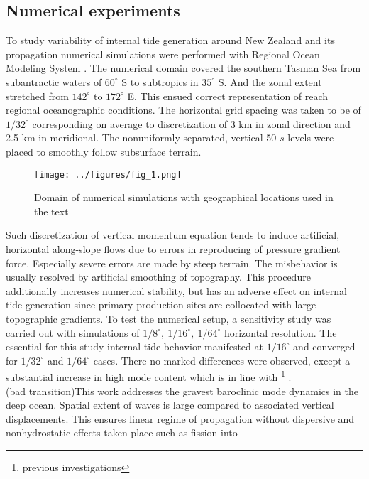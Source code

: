 \documentclass[12pt]{article}
\begin{document}
\subsection{Numerical experiments}
To study variability of internal tide generation around New Zealand and its propagation numerical 
simulations were performed with Regional Ocean Modeling System \citep{shchepetkin2005regional}. 
The numerical domain covered the southern Tasman Sea from subantractic waters of $60^{\circ}$ S 
to subtropics in $35^{\circ}$ S. And the zonal extent stretched from $142^{\circ}$ to $172^{\circ}$ 
E. This ensued correct representation of reach regional oceanographic conditions. The horizontal 
grid spacing was taken to be of $1/32^{\circ}$ corresponding on average to discretization of 3 km 
in zonal direction and 2.5 km in meridional. The nonuniformly separated, vertical 50 $s$-levels 
were placed to smoothly follow subsurface terrain.\\
\begin{figure}
	\centering
	\texttt{[image: ../figures/fig\_1.png]}
	\caption{Domain of numerical simulations with geographical locations used in the text}
	\label{C3:fig:geo.map}
\end{figure}
Such discretization of vertical momentum equation tends to induce artificial, horizontal  
along-slope flows \citep{haidvogel1999numerical} due to errors in reproducing of pressure 
gradient force. Especially severe errors are made by steep terrain. The misbehavior is usually 
resolved by artificial smoothing of topography. This procedure additionally increases numerical 
stability, but has an adverse effect on internal tide generation \citep{di2006numerical} since 
primary production sites are collocated with large topographic gradients. To test the numerical 
setup, a sensitivity study was carried out with simulations of 
$1/8^{\circ},~1/16^{\circ},~1/64^{\circ}$ horizontal resolution. The essential for this study 
internal tide behavior manifested at $1/16^{\circ}$ and converged for $1/32^{\circ}$ and 
$1/64^{\circ}$ cases. There no marked differences were observed, except a substantial increase in 
high mode content which is in line with \footnote{previous investigations} 
\citep{di2006numerical}.\\
(bad transition)This work addresses the gravest baroclinic mode dynamics in the deep ocean. Spatial 
extent of 
waves is large compared to associated vertical displacements. This ensures linear regime of 
propagation without dispersive and nonhydrostatic effects taken place such as fission into 
\end{document}

